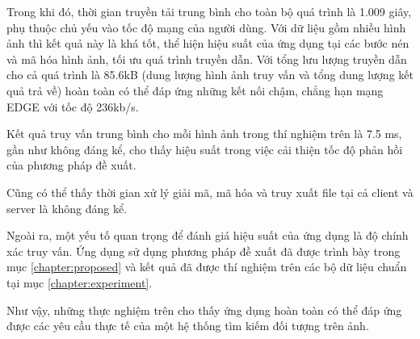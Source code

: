 	Trong khi đó, thời gian truyền tải trung bình cho toàn bộ quá trình là 1.009 giây, phụ thuộc chủ yếu vào tốc độ mạng của người dùng. Với dữ liệu gồm nhiều hình ảnh thì kết quả này là khá tốt, thể hiện hiệu suất của ứng dụng tại các bước nén và mã hóa hình ảnh, tối ưu quá trình truyền dẫn. Với tổng lưu lượng truyền dẫn cho cả quá trình là 85.6kB (dung lượng hình ảnh truy vấn và tổng dung lượng kết quả trả về) hoàn toàn có thể đáp ứng những kết nối chậm, chẳng hạn mạng EDGE với tốc độ 236kb/s.
	
	Kết quả truy vấn trung bình cho mỗi hình ảnh trong thí nghiệm trên là 7.5 ms, gần như không đáng kể,  cho thấy hiệu suất trong việc cải thiện tốc độ phản hồi của phương pháp đề xuất.
	
	Cũng có thể thấy thời gian xử lý giải mã, mã hóa và truy xuất file tại cả client và server là không đáng kể.
	
	Ngoài ra, một yếu tố quan trọng để đánh giá hiệu suất của ứng dụng là độ chính xác truy vấn. Ứng dụng sử dụng phương pháp đề xuất đã được trình bày trong mục \ref{chapter:proposed} và kết quả đã được thí nghiệm trên các bộ dữ liệu chuẩn tại mục \ref{chapter:experiment}. 
	
	Như vậy, những thực nghiệm trên cho thấy ứng dụng hoàn toàn có thể đáp ứng được các yêu cầu thực tế của một hệ thống tìm kiếm đối tượng trên ảnh.